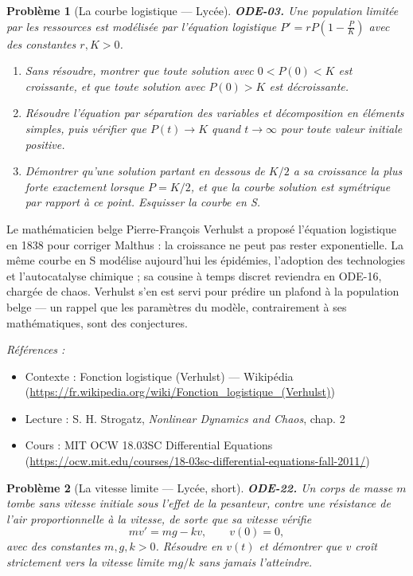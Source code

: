 \documentclass[11pt]{article}
\newtheorem{problem}{Problème}
\newenvironment{refs}{\par\small\noindent\emph{Références :}\begin{itemize}\setlength\itemsep{0pt}}{\end{itemize}\normalsize}
\begin{document}
\begin{problem}[{La courbe logistique --- Lycée}]
\textbf{ODE-03.} Une population limitée par les ressources est modélisée par l'équation
logistique $ P' = r P \left( 1 - \frac{P}{K} \right) $ avec des constantes
$ r, K >0 $.
\begin{enumerate}
\item[(a)] Sans résoudre, montrer que toute solution avec $ 0 <P(0) <K $ est croissante, et que
toute solution avec $ P(0) >K $ est décroissante.
\item[(b)] Résoudre l'équation par séparation des variables et décomposition en éléments simples, puis
vérifier que $ P(t) \to K $ quand $ t \to \infty $ pour toute valeur initiale
positive.
\item[(c)] Démontrer qu'une solution partant en dessous de $ K/2 $ a sa croissance la plus forte
exactement lorsque $ P = K/2 $, et que la courbe solution est symétrique par rapport à ce
point. Esquisser la courbe en S.
\end{enumerate}

\end{problem}

\noindent Le mathématicien belge Pierre-François Verhulst a proposé l'équation logistique
en 1838 pour corriger Malthus : la croissance ne peut pas rester exponentielle. La même courbe en
S modélise aujourd'hui les épidémies, l'adoption des technologies et l'autocatalyse chimique ;
sa cousine à temps discret reviendra en ODE-16, chargée de chaos. Verhulst s'en est servi pour
prédire un plafond à la population belge --- un rappel que les paramètres du modèle, contrairement
à ses mathématiques, sont des conjectures.

\begin{refs}
\item Contexte : Fonction logistique (Verhulst) --- Wikipédia (\url{https://fr.wikipedia.org/wiki/Fonction_logistique_(Verhulst)})
\item Lecture : S. H. Strogatz, \textit{Nonlinear Dynamics and Chaos}, chap. 2
\item Cours : MIT OCW 18.03SC Differential Equations (\url{https://ocw.mit.edu/courses/18-03sc-differential-equations-fall-2011/})
\end{refs}

\bigskip

\begin{problem}[{La vitesse limite --- Lycée, short}]
\textbf{ODE-22.} Un corps de masse $ m $ tombe sans vitesse initiale sous
l'effet de la pesanteur, contre une résistance de l'air proportionnelle à la vitesse, de sorte
que sa vitesse vérifie
\[ m v' = mg - k v, \qquad v(0) = 0, \]
avec des constantes $ m, g, k >0 $. Résoudre en $ v(t) $ et démontrer que $ v $ croît
strictement vers la vitesse limite $ mg/k $ sans jamais l'atteindre.
\end{problem}
\end{document}
